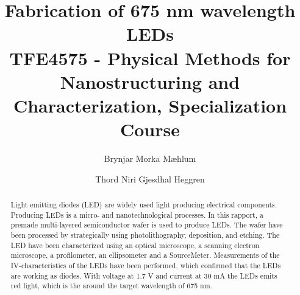\documentclass[5p,sort&compress]{elsarticle}
\begin{document}
\begin{frontmatter}

  \title{Fabrication of 675 nm wavelength LEDs \\ \large{TFE4575 - Physical Methods for Nanostructuring and Characterization, Specialization Course}}

  \author[fysikk]{Brynjar Morka Mæhlum}
  \author[fysikk]{Thord Niri Gjesdhal Heggren}
  \address[fysikk]{Department of Physics, Norwegian University of Science and Technology, 7491 Trondheim, Norway.}

  \begin{abstract}

    \noindent Light emitting diodes (LED) are widely used light producing electrical components.
    Producing LEDs is a micro- and nanotechnological processes.
    In this rapport, a premade multi-layered semiconductor wafer is used to produce LEDs.
    The wafer have been processed by strategically using photolithography, deposition, and etching.
    The LED have been characterized using an optical microscope, a scanning electron microscope, a profilometer, an ellipsometer and a SourceMeter.
    Measurements of the IV-characteristics of the LEDs have been performed, which confirmed that the LEDs are working as diodes.
    With voltage at 1.7 V and current at 30 mA the LEDs emits red light, which is the around the target wavelength of 675 nm.

  \end{abstract}
 

\end{frontmatter}
\end{document}
